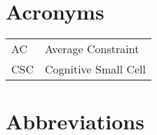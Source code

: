 \section*{Acronyms}
\begin{table*}[h!]
  \renewcommand{\arraystretch}{1.4}
  \begin{tabular}{p{}p{}}
    AC & Average Constraint\\
   CSC & Cognitive Small Cell\\
  \end{tabular}
\end{table*}
  



\section*{Abbreviations}
\begin{acronym}[ANNNNOVA]
\end{acronym}

